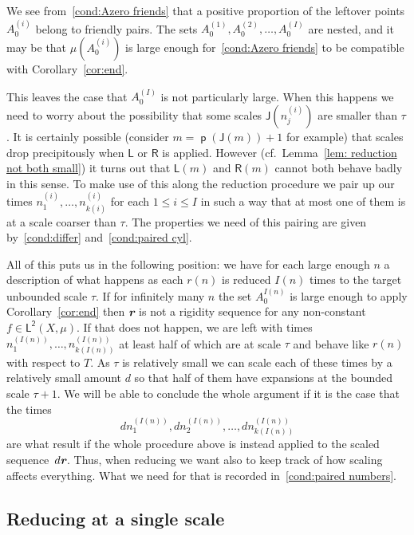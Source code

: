 \documentclass[10pt]{amsart}
\theoremstyle{definition}\newtheorem{defi}[theo]{Definition}\newtheorem{rema}[theo]{Remark}\newtheorem{exam}[theo]{Example}\newtheorem{exem}[theo]{Example}\newtheorem{nota}[theo]{Notation}
\DeclareMathOperator{\p}{\mathsf{p}}
\newcommand{\lp}{\mathsf{L}}
\newcommand{\ltwo}{\lp^{\!\mathsf{2}}}
\newcommand{\lft}{\mathsf{L}}
\newcommand{\rht}{\mathsf{R}}
\newcommand{\scl}{\mathsf{J}}
\def\mathbi#1{\textbf{\em #1}}
\newcommand{\bir}{\mathbi{r}}
\begin{document}
We see from~\eqref{cond:Azero friends} that a positive proportion of the leftover points $A^{(i)}_0$ belong to friendly pairs. The sets $A^{(1)}_0,A^{(2)}_0,\dots,A^{(I)}_0$ are nested, and it may be that $\mu(A^{(i)}_0)$ is large enough for~\ref{cond:Azero friends} to be compatible with Corollary~\ref{cor:end}.

This leaves the case that $A^{(I)}_0$ is not particularly large. When this happens we need to worry about the possibility that some scales $\scl(n^{(i)}_j)$ are smaller than $\tau$. It is certainly possible (consider $m = \p(\scl(m))+1$ for example) that scales drop precipitously when $\lft$ or $\rht$ is applied. However (cf.\ Lemma~\ref{lem: reduction not both small}) it turns out that $\lft(m)$ and $\rht(m)$ cannot both behave badly in this sense. To make use of this along the reduction procedure we pair up our times $n^{(i)}_1,\dots,n^{(i)}_{k(i)}$ for each $1 \le i \le I$ in such a way that at most one of them is at a scale coarser than $\tau$. The properties we need of this pairing are given by~\eqref{cond:differ} and~\eqref{cond:paired cyl}.

All of this puts us in the following position: we have for each large enough $n$ a description of what happens as each $r(n)$ is reduced $I(n)$ times to the target unbounded scale $\tau$. If for infinitely many $n$ the set $A^{I(n)}_0$ is large enough to apply Corollary~\ref{cor:end} then $ \bir$ is not a rigidity sequence for any non-constant $f \in
\ltwo(X,\mu)$. If that does not happen, we are left with times $n^{(I(n))}_1,\dots,n^{(I(n))}_{k(I(n))}$ at least half of which are at scale $\tau$ and behave like $r(n)$ with respect to $T$. As $\tau$ is relatively small we can scale each of these times by a relatively small amount $d$ so that half of them have expansions at the bounded scale $\tau+1$. We will be able to conclude the whole argument if it is the case that the times
\[
d n^{(I(n))}_1,d n^{(I(n))}_2,\dots,d n^{(I(n))}_{k(I(n))}
\]
are what result if the whole procedure above is instead applied to the scaled sequence~$d  \bir$. Thus, when reducing we want also to keep track of how scaling affects everything. What we need for that is recorded in~\eqref{cond:paired numbers}.




\subsection{Reducing at a single scale}\label{subsec:reduction once}
\end{document}
